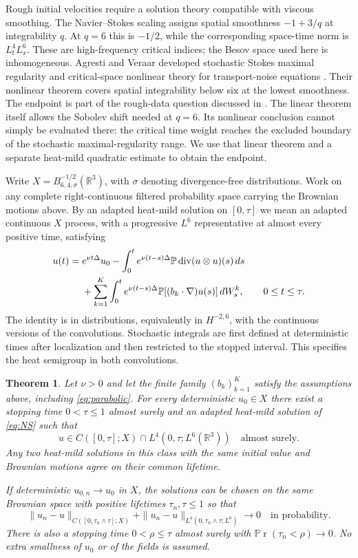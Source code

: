 \documentclass[11pt]{article}
\newcommand{\R}{\mathbb R}
\newcommand{\Pp}{\mathbb P}
\renewcommand{\Pr}{\mathbb P\!\operatorname{r}}
\newtheorem{theorem}{Theorem}[section]
\numberwithin{equation}{section}
\begin{document}
Rough initial velocities require a solution theory compatible with viscous
smoothing. The Navier--Stokes scaling assigns spatial smoothness $-1+3/q$
at integrability $q$. At $q=6$ this is $-1/2$, while the corresponding
space-time norm is $L^4_tL^6_x$. These are high-frequency critical indices;
the Besov space used here is inhomogeneous.
Agresti and Veraar developed stochastic Stokes maximal regularity and
critical-space nonlinear theory for transport-noise equations
\cite{AV24}. Their nonlinear theorem covers spatial integrability below
six at the lowest smoothness. The endpoint is part of the rough-data
question discussed in \cite[Theorem 8.26 and Open Problem 10]{AV25}.
The linear theorem itself allows the Sobolev shift needed at $q=6$.
Its nonlinear conclusion cannot simply be evaluated there: the critical
time weight reaches the excluded boundary of the stochastic
maximal-regularity range. We use that linear theorem and a separate
heat-mild quadratic estimate to obtain the endpoint.

Write $X=B^{-1/2}_{6,4,\sigma}(\R^3)$, with $\sigma$ denoting divergence-free
distributions. Work on any complete right-continuous filtered probability
space carrying the Brownian motions above. By an adapted heat-mild solution
on $[0,\tau]$ we mean an adapted continuous $X$ process, with a progressive
$L^6$ representative at almost every positive time, satisfying
\begin{align}\label{eq:mild}
 u(t)={}&e^{\nu t\Delta}u_0
 -\int_0^te^{\nu(t-s)\Delta}\Pp\operatorname{div}(u\otimes u)(s)\,ds\notag\\
 &+\sum_{k=1}^K\int_0^te^{\nu(t-s)\Delta}
                  \Pp[(b_k\cdot\nabla)u(s)]\,dW_s^k,
 \qquad 0\leq t\leq\tau.
\end{align}
The identity is in distributions, equivalently in $H^{-2,6}$, with the
continuous versions of the convolutions. Stochastic integrals are first
defined at deterministic times after localization and then restricted to the
stopped interval. This specifies the heat semigroup in both convolutions.

\begin{theorem}\label{thm:main}
Let $\nu>0$ and let the finite family $(b_k)_{k=1}^K$ satisfy the assumptions
above, including \eqref{eq:parabolic}. For every deterministic $u_0\in X$
there exist a stopping time $0<\tau\leq1$ almost surely and an adapted
heat-mild solution of \eqref{eq:NS} such that
\[
 u\in C([0,\tau];X)\cap L^4(0,\tau;L^6(\R^3))
 \quad\text{almost surely}.
\]
Any two heat-mild solutions in this class with the same initial value and
Brownian motions agree on their common lifetime.

If deterministic $u_{0,n}\to u_0$ in $X$, the solutions can be chosen on the
same Brownian space with positive lifetimes $\tau_n,\tau\leq1$ so that
\[
 \|u_n-u\|_{C([0,\tau_n\wedge\tau];X)}
 +\|u_n-u\|_{L^4(0,\tau_n\wedge\tau;L^6)}\longrightarrow0
 \quad\text{in probability}.
\]
There is also a stopping time $0<\rho\leq\tau$ almost surely with
$\Pr(\tau_n<\rho)\to0$. No extra smallness of $u_0$ or of the fields is
assumed.
\end{theorem}
\end{document}
